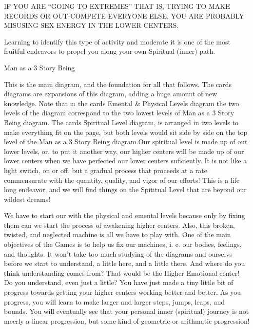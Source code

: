 \documentclass[12pt,letterpaper]{book}
\begin{document}
IF YOU ARE ``GOING TO EXTREMES'' THAT IS, TRYING TO MAKE RECORDS OR OUT-COMPETE EVERYONE ELSE, YOU ARE PROBABLY MISUSING SEX ENERGY IN THE LOWER CENTERS.

Learning to identify this type of activity and moderate it is one of the most fruitful endeavors to propel you along your own Spiritual (inner) path.


Man as a 3 Story Being

This is the main diagram, and the foundation for all that follows. The cards diagrams are expansions of this diagram, adding a huge amount of new knowledge. Note that in the cards Emental \& Physical Levels diagram the two levels of the diagram correspond to the two lowest levels of Man as a 3 Story Being diagram. The cards Spiritual Level diagram, is arranged in two levels to make everything fit on the page, but both levels would sit side by side on the top level of the Man as a 3 Story Being diagram.Our spiritual level is made up of out lower levels, or, to put it another way, our higher centers will be made up of our lower centers when we have perfected our lower centers suficiently. It is not like a light switch, on or off, but a gradual process that proceeds at a rate commensurate with the quantity, quality, and vigor of our efforts! This is a life long endeavor, and we will find things on the Spititual Level that are beyond our wildest dreams!

We have to start our with the physical and emental levels because only by fixing them can we start the process of awakening higher centers. Also, this broken, twisted, and neglected machine is all we have to play with. One of the main objectives of the Games is to help us fix our machines, i. e. our bodies, feelings, and thoughts. It won't take too much studying of the diagrams and ourselvs before we start to understand, a little here, and a little there. And where do you think understanding comes from? That would be the Higher Emotional center! Do you understand, even just a little? You have just made a tiny little bit of progress towards getting your higher centers working better and better. As you progress, you will learn to make larger and larger steps, jumps, leaps, and bounds. You will eventually see that your personal inner (spiritual) journey is not meerly a linear progression, but some kind of geometric or arithmatic progression! 
\end{document}
